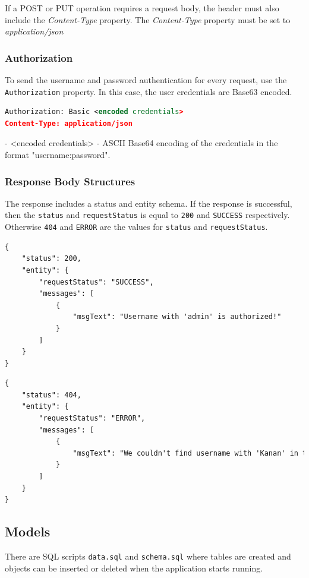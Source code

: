 If a POST or PUT operation requires a request body, the header must also include the \emph{Content-Type} property. The \emph{Content-Type} property must be set to \emph{application/json} 

\subsubsection{Authorization}
To send the username and password authentication for every request, use the \texttt{Authorization} property. In this case, the user credentials are Base63 encoded.

\begin{lstlisting}[language={XML}]
Authorization: Basic <encoded credentials>
Content-Type: application/json
\end{lstlisting}

- <encoded credentials> - ASCII Base64 encoding of the credentials in the format "username:password".

\subsubsection{Response Body Structures}
\label{subsubsec:response-body-structures}

The response includes a status and entity schema. If the response is successful, then the \texttt{status} and \texttt{requestStatus} is equal to \texttt{200} and \texttt{SUCCESS} respectively. Otherwise \texttt{404} and \texttt{ERROR} are the  values for \texttt{status} and \texttt{requestStatus}.

\begin{lstlisting}[language={Xml}]
{
    "status": 200,
    "entity": {
        "requestStatus": "SUCCESS",
        "messages": [
            {
                "msgText": "Username with 'admin' is authorized!"
            }
        ]
    }
}
\end{lstlisting}
\begin{lstlisting}[language={Xml}]
{
    "status": 404,
    "entity": {
        "requestStatus": "ERROR",
        "messages": [
            {
                "msgText": "We couldn't find username with 'Kanan' in the system!"
            }
        ]
    }
}
\end{lstlisting}

\subsection{Models}
\label{subsec:models}
There are SQL scripts \texttt{data.sql} and \texttt{schema.sql} where tables are created and objects can be inserted or deleted when the application starts running.

